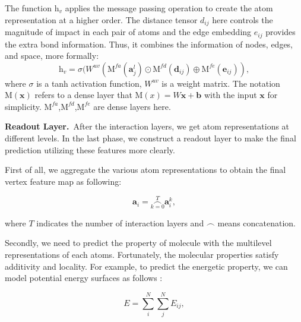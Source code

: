 \documentclass[letterpaper]{article} \usepackage{bm}
\begin{document}
The function $\mathrm{h}_v$ applies the message passing operation to create the atom representation at a higher order. The distance tensor $d_{ij}$ here controls the magnitude of impact in each pair of atoms and the edge embedding $e_{ij}$ provides the extra bond information. Thus, it combines the information of nodes, edges, and space, more formally:  
  \begin{equation}
\mathrm{h}_v = \sigma(W^{uv} ( \mathrm{M}^{fa}(\bm{a}^l_j) \odot \mathrm{M}^{fd}(\bm{d}_{ij}) \oplus \mathrm{M}^{fe}(\bm{e}_{ij})), 
\end{equation} 
where $\sigma$ is a tanh activation function, $W^{uv}$ is a weight matrix. The notation $\mathrm{M}(\bm{x})$ refers to a dense layer that $\mathrm{M}(x)=W\bm{x} +\bm{b}$ with the input $\bm{x}$ for simplicity. $\mathrm{M}^{fa}$,$\mathrm{M}^{fd}$,$\mathrm{M}^{fe}$ are dense layers here.



\textbf{Readout Layer.}\ After the interaction layers, we get atom representations at different levels. In the last phase, we construct a readout layer to make the final prediction utilizing these features more clearly.   

First of all, we aggregate the various atom representations to obtain the final vertex feature map as following:  

  \begin{equation}
\bm{a}_i = \mathop{\frown}\limits_{k=0}^{T}\bm{a}_i^k, 
\end{equation}   

\noindent where $T$ indicates the number of interaction layers and $\mathop{\frown}$ means concatenation.    

Secondly, we need to predict the property of molecule with the multilevel representations of each atoms. Fortunately, the molecular properties satisfy additivity and locality. For example, to predict the energetic property, we can model potential energy surfaces as follows \cite{behler2014representing,cubuk2017representations}:  

  \begin{equation}
E=\sum_{i}^{N}\sum_{j}^{N}E_{ij}, 
\end{equation}  
\end{document}
